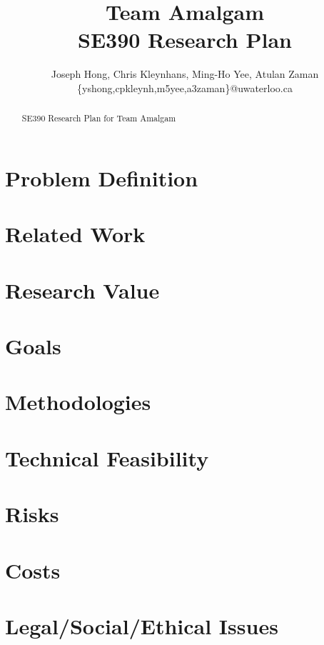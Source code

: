 \documentclass[11pt]{article}
\title{{\Large Team Amalgam} \\ SE390 Research Plan}
\author{Joseph Hong, Chris Kleynhans, Ming-Ho Yee, Atulan Zaman \\
        \{yshong,cpkleynh,m5yee,a3zaman\}@uwaterloo.ca}
\begin{document}
\maketitle

\begin{abstract}

SE390 Research Plan for Team Amalgam

\end{abstract}

\tableofcontents
\newpage

\section{Problem Definition}

\section{Related Work}

\section{Research Value}

\section{Goals}

\section{Methodologies}

\section{Technical Feasibility}

\section{Risks}

\section{Costs}

\section{Legal/Social/Ethical Issues}

\end{document}
